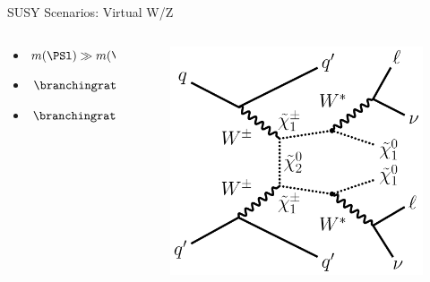 \begin{frame}[fragile]{SUSY Scenarios: Virtual W/Z}
  \begin{columns}
    \begin{column}{0.6\textwidth}
       \begin{itemize}
        \item \( m(\PSl) \gg m(\PSGczDt) \)
        \item \(\branchingratio(\PSGcpmDo\to\PSGczDo\PWpmst)=1\)
        \item \(\branchingratio(\PSGczDt\to\PSGczDo\PZst)=1\)
      \end{itemize}
     
    \end{column}

    \begin{column}{0.4\textwidth}
      \begin{figure}[htpb]
        \centering
        \includegraphics[width=1.0\textwidth]{fig/scenarios/FeynmanVirtualWZ.pdf}
      \end{figure}
      
    \end{column}
  \end{columns}
\end{frame}

